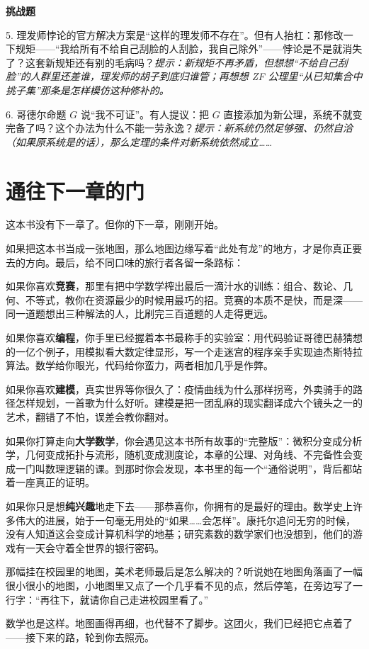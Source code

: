 \textbf{挑战题}

5. 理发师悖论的官方解决方案是“这样的理发师不存在”。但有人抬杠：那修改一下规矩——“我给所有不给自己刮脸的人刮脸，我自己除外”——悖论是不是就消失了？这套新规矩还有别的毛病吗？\emph{提示：新规矩不再矛盾，但想想“不给自己刮脸”的人群里还差谁，理发师的胡子到底归谁管；再想想 ZF 公理里“从已知集合中挑子集”那条是怎样模仿这种修补的。}

6. 哥德尔命题 $G$ 说“我不可证”。有人提议：把 $G$ 直接添加为新公理，系统不就变完备了吗？这个办法为什么不能一劳永逸？\emph{提示：新系统仍然足够强、仍然自洽（如果原系统是的话），那么定理的条件对新系统依然成立……}

\section*{通往下一章的门}

这本书没有下一章了。但你的下一章，刚刚开始。

如果把这本书当成一张地图，那么地图边缘写着“此处有龙”的地方，才是你真正要去的方向。最后，给不同口味的旅行者各留一条路标：

如果你喜欢\textbf{竞赛}，那里有把中学数学榨出最后一滴汁水的训练：组合、数论、几何、不等式，教你在资源最少的时候用最巧的招。竞赛的本质不是快，而是深——同一道题想出三种解法的人，比刷完三百道题的人走得更远。

如果你喜欢\textbf{编程}，你手里已经握着本书最称手的实验室：用代码验证哥德巴赫猜想的一亿个例子，用模拟看大数定律显形，写一个走迷宫的程序亲手实现迪杰斯特拉算法。数学给你眼光，代码给你蛮力，两者相加几乎是作弊。

如果你喜欢\textbf{建模}，真实世界等你很久了：疫情曲线为什么那样拐弯，外卖骑手的路径怎样规划，一首歌为什么好听。建模是把一团乱麻的现实翻译成六个镜头之一的艺术，翻错了不怕，误差会教你翻对。

如果你打算走向\textbf{大学数学}，你会遇见这本书所有故事的“完整版”：微积分变成分析学，几何变成拓扑与流形，随机变成测度论，本章的公理、对角线、不完备性会变成一门叫数理逻辑的课。到那时你会发现，本书里的每一个“通俗说明”，背后都站着一座真正的证明。

如果你只是想\textbf{纯兴趣}地走下去——那恭喜你，你拥有的是最好的理由。数学史上许多伟大的进展，始于一句毫无用处的“如果……会怎样”。康托尔追问无穷的时候，没有人知道这会变成计算机科学的地基；研究素数的数学家们也没想到，他们的游戏有一天会守着全世界的银行密码。

那幅挂在校园里的地图，美术老师最后是怎么解决的？听说她在地图角落画了一幅很小很小的地图，小地图里又点了一个几乎看不见的点，然后停笔，在旁边写了一行字：“再往下，就请你自己走进校园里看了。”

数学也是这样。地图画得再细，也代替不了脚步。这团火，我们已经把它点着了——接下来的路，轮到你去照亮。
